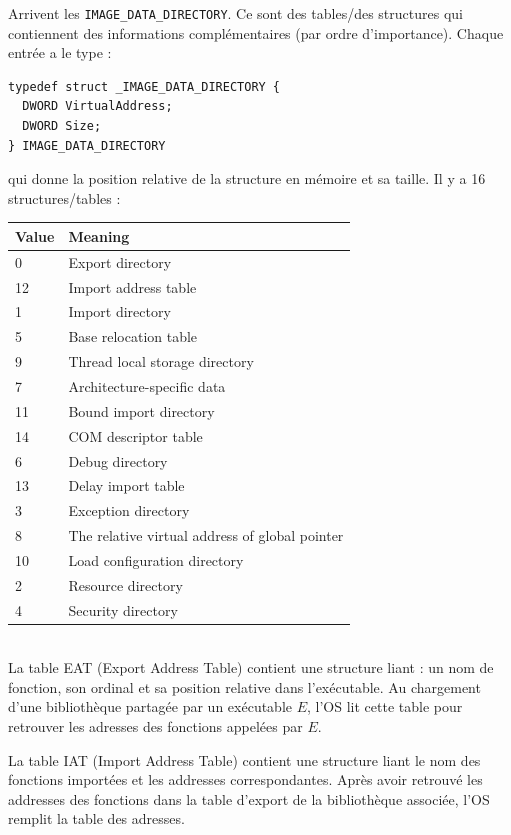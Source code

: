 \documentclass{book}
\newenvironment{commentaire}[1]{%
	\def\FrameCommand{\fboxrule=\FrameRule\fboxsep=\FrameSep \fcolorbox{yellow!50}{yellow!10}}%
	\MakeFramed {\advance\hsize-\width \FrameRestore}
	\noindent {\bf #1}\\
}%
{\endMakeFramed}
\newcommand{\code}[1]{\texttt{#1}}
\begin{document}
Arrivent les \code{IMAGE\_DATA\_DIRECTORY}. Ce sont des tables/des structures  qui contiennent des informations complémentaires (par ordre d'importance). Chaque entrée a le type : 

\begin{verbatim}
typedef struct _IMAGE_DATA_DIRECTORY {
  DWORD VirtualAddress;
  DWORD Size;
} IMAGE_DATA_DIRECTORY
\end{verbatim}
qui donne la position relative de la structure en mémoire et sa taille. Il y a 16 structures/tables :  

\bigskip
\begin{tabular}{| l | l |}
	\hline
Value	&Meaning \\
\hline
0 & Export directory\\
12&Import address table\\
1&Import directory \\
5 &Base relocation table\\
9 & Thread local storage directory\\
7 &Architecture-specific data \\
11&Bound import directory\\
14&COM descriptor table\\
6&Debug directory\\
13&Delay import table\\
3 &Exception directory \\
8 & The relative virtual address of global pointer\\
10 &Load configuration directory\\
2 & Resource directory \\
4& Security directory \\
\hline
\end{tabular}


\begin{commentaire}{En bref}
La table EAT (Export Address Table) contient une structure liant : un nom de fonction, son ordinal et sa position relative dans l'exécutable. Au chargement d'une bibliothèque partagée par un exécutable $E$, l'OS lit cette table pour retrouver les adresses des fonctions appelées par $E$.



La table IAT (Import Address Table) contient une structure liant le nom des fonctions importées et les addresses correspondantes. Après avoir retrouvé les addresses des fonctions dans la table d'export de la bibliothèque associée, l'OS remplit la table des adresses.  
\end{commentaire}
\end{document}
